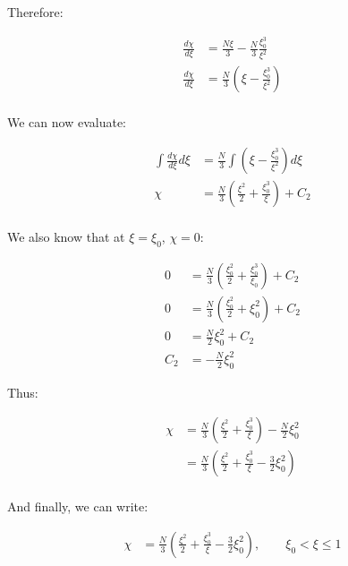 \documentclass[letterpaper,12pt]{article}
\begin{document}
Therefore:

\begin{equation}
\begin{aligned}
    \frac{d\chi}{d\xi} &= \frac{N\xi}{3} - \frac{N}{3} \frac{\xi^3_0}{\xi^2} \\
    \frac{d\chi}{d\xi} &= \frac{N}{3} \left( \xi - \frac{\xi^3_0}{\xi^2} \right) \\
\end{aligned}
\end{equation}

We can now evaluate:

\begin{equation}
\begin{aligned}
    \int \frac{d\chi}{d\xi} d \xi &= \frac{N}{3} \int \left( \xi - \frac{\xi^3_0}{\xi^2} \right) d \xi \\
    \chi                          &= \frac{N}{3} \left( \frac{\xi^2}{2} + \frac{\xi^3_0}{\xi} \right) + C_2 \\
\end{aligned}
\end{equation}

We also know that at $\xi = \xi_0$, $\chi = 0$:

\begin{equation}
\begin{aligned}
    0   &= \frac{N}{3} \left( \frac{\xi^2_0}{2} + \frac{\xi^3_0}{\xi_0} \right) + C_2 \\
    0   &= \frac{N}{3} \left( \frac{\xi^2_0}{2} + \xi^2_0 \right) + C_2 \\
    0   &= \frac{N}{2} \xi^2_0 + C_2 \\
    C_2 &= -\frac{N}{2} \xi^2_0
\end{aligned}
\end{equation}

Thus:

\begin{equation}
\begin{aligned}
    \chi &= \frac{N}{3} \left( \frac{\xi^2}{2} + \frac{\xi_0^3}{\xi} \right) - \frac{N}{2} \xi^2_0 \\
        &= \frac{N}{3} \left( \frac{\xi^2}{2} + \frac{\xi_0^3}{\xi} - \frac{3}{2} \xi^2_0 \right) \\
\end{aligned}
\end{equation}

And finally, we can write:

\begin{equation}
\boxed{
\begin{aligned}
    \chi &= \frac{N}{3} \left( \frac{\xi^2}{2} + \frac{\xi_0^3}{\xi} - \frac{3}{2} \xi^2_0 \right), \qquad \xi_0 < \xi \leq 1\\
\end{aligned}
}
\end{equation}
\end{document}
